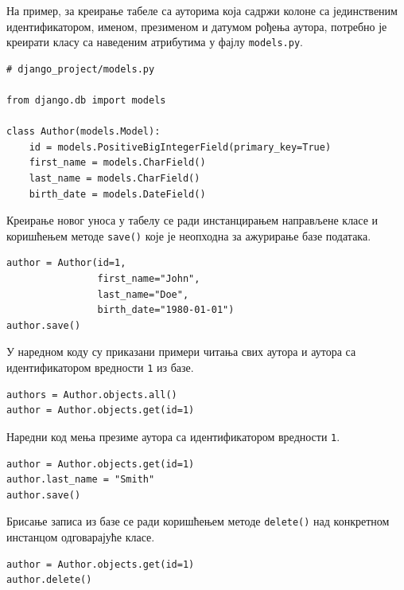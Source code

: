 \documentclass[12pt,oneside]{memoir}
\begin{document}
На пример, за креирање табеле са ауторима која садржи колоне са јединственим идентификатором, именом, презименом и датумом рођења аутора, потребно је креирати класу са наведеним атрибутима у фајлу \texttt{models.py}.

\begin{lstlisting}
# django_project/models.py

from django.db import models

class Author(models.Model):
    id = models.PositiveBigIntegerField(primary_key=True)
    first_name = models.CharField()
    last_name = models.CharField()
    birth_date = models.DateField()
\end{lstlisting}


Креирање новог уноса у табелу се ради инстанцирањем направљене класе и коришћењем методе \texttt{save()} које је неопходна за ажурирање базе података. \\

\begin{lstlisting}
author = Author(id=1, 
                first_name="John", 
                last_name="Doe", 
                birth_date="1980-01-01")
author.save()
\end{lstlisting}

У наредном коду су приказани примери читања свих аутора и аутора са идентификатором вредности \texttt{1} из базе.
\begin{lstlisting}
authors = Author.objects.all()
author = Author.objects.get(id=1)
\end{lstlisting}

Наредни код мења презиме аутора са идентификатором вредности \texttt{1}.
\begin{lstlisting}
author = Author.objects.get(id=1)
author.last_name = "Smith"
author.save()
\end{lstlisting}

Брисање записа из базе се ради коришћењем методе \texttt{delete()} над конкретном инстанцом одговарајуће класе.
\begin{lstlisting}
author = Author.objects.get(id=1)
author.delete()
\end{lstlisting}
\end{document}
